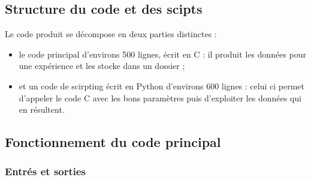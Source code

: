 \documentclass[a4paper, openany, 11pt]{article}
\begin{document}
\subsection{Structure du code et des scipts}

Le code produit se décompose en deux parties distinctes :
\begin{itemize}
    \item le code principal d'environs 500 lignes, écrit en C  : il produit les données pour une expérience
        et les stocke dans un dossier ;
    \item et un code de scirpting écrit en Python d'environs 600 lignes : celui ci permet d'appeler le code C avec
        les bons paramètres puis d'exploiter les données qui en résultent.
\end{itemize}

\subsection{Fonctionnement du code principal}

\subsubsection{Entrés et sorties}
\end{document}
